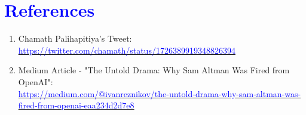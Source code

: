 \documentclass{article}
\begin{document}
\section{\textcolor{blue}{References}}
\begin{enumerate}
    \item Chamath Palihapitiya's Tweet: \\
    \href{https://twitter.com/chamath/status/1726389919348826394}{\textcolor{blue}{https://twitter.com/chamath/status/1726389919348826394}}
    
    \item Medium Article - "The Untold Drama: Why Sam Altman Was Fired from OpenAI": \\
    \href{https://medium.com/@ivanreznikov/the-untold-drama-why-sam-altman-was-fired-from-openai-eaa234d2d7e8#:~:text=in%20Altman's%20leadership.-,Security%20issues,allow%20hackers%20to%20steal%20data.}{\textcolor{blue}{https://medium.com/@ivanreznikov/the-untold-drama-why-sam-altman-was-fired-from-openai-eaa234d2d7e8}}
\end{enumerate}
\end{document}
